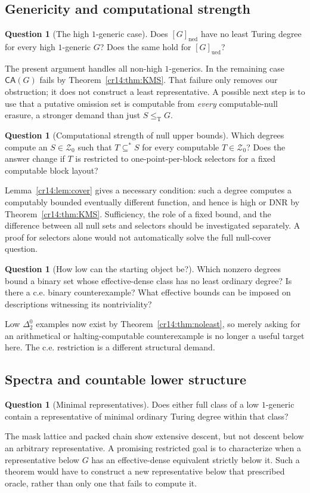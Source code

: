 \documentclass[11pt,a4paper]{article}
\newcommand{\leT}{\leq_{\mathrm T}}
\newcommand{\ned}{\mathrm{ned}}
\newcommand{\ued}{\mathrm{ued}}
\newcommand{\Znull}{\mathcal Z_0}
\newcommand{\substar}{\subseteq^{*}}
\newcommand{\CA}{\mathsf{CA}}
\theoremstyle{definition}
\newtheorem{question}[theorem]{Question}
\theoremstyle{remark}
\begin{document}
\subsection{Genericity and computational strength}
\begin{question}[The high $1$-generic case]\label{cr14:q:high}
Does $[G]_{\ned}$ have no least Turing degree for every high $1$-generic $G$?
Does the same hold for $[G]_{\ued}$?
\end{question}
The present argument handles all non-high $1$-generics. In the remaining
case $\CA(G)$ fails by Theorem~\ref{cr14:thm:KMS}. That failure only removes
our obstruction; it does not construct a least representative. A possible
next step is to use that a putative omission set is computable from
\emph{every} computable-null erasure, a stronger demand than just $S\leT G$.

\begin{question}[Computational strength of null upper bounds]\label{cr14:q:cover}
Which degrees compute an $S\in\Znull$ such that $T\substar S$ for every
computable $T\in\Znull$? Does the answer change if $T$ is restricted to
one-point-per-block selectors for a fixed computable block layout?
\end{question}
Lemma~\ref{cr14:lem:cover} gives a necessary condition: such a degree computes
a computably bounded eventually different function, and hence is high or
DNR by Theorem~\ref{cr14:thm:KMS}. Sufficiency, the role of a fixed bound, and
the difference between all null sets and selectors should be investigated
separately. A proof for selectors alone would not automatically solve the
full null-cover question.

\begin{question}[How low can the starting object be?]\label{cr14:q:low}
Which nonzero degrees bound a binary set whose effective-dense class has no
least ordinary degree? Is there a c.e. binary counterexample? What effective
bounds can be imposed on descriptions witnessing its nontriviality?
\end{question}
Low $\Delta^0_2$ examples now exist by Theorem~\ref{cr14:thm:noleast}, so merely
asking for an arithmetical or halting-computable counterexample is no longer
a useful target here. The c.e. restriction is a different structural demand.

\subsection{Spectra and countable lower structure}
\begin{question}[Minimal representatives]\label{cr14:q:minimal}
Does either full class of a low $1$-generic contain a representative of
minimal ordinary Turing degree within that class?
\end{question}
The mask lattice and packed chain show extensive descent, but not descent
below an arbitrary representative. A promising restricted goal is to
characterize when a representative below $G$ has an effective-dense
equivalent strictly below it. Such a theorem would have to construct a new
representative below that prescribed oracle, rather than only one that
fails to compute it.
\end{document}
